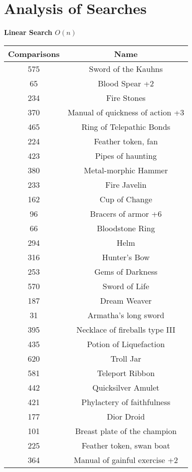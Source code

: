 \documentclass[letterpaper, 10pt]{article}
\begin{document}
\section{Analysis of Searches} 
\newpage
\begin{center}
    \bf{Linear Search $O(n)$}\\
    \begin{tabular}{|| c c ||}
    \hline
    \bf{Comparisons} & \bf{Name} \\
    \hline
    575 & Sword of the Kauhns \\
    65  & Blood Spear +2\\
    234 & Fire Stones\\
    370 & Manual of quickness of action +3\\
    465 & Ring of Telepathic Bonds\\
    224 & Feather token, fan\\
    423 & Pipes of haunting\\
    380 & Metal-morphic Hammer\\
    233 & Fire Javelin\\
    162 & Cup of Change\\
    96  & Bracers of armor +6\\
    66  & Bloodstone Ring\\
    294 & Helm\\
    316 & Hunter's Bow\\
    253 & Gems of Darkness\\
    570 & Sword of Life\\
    187 & Dream Weaver\\
    31  & Armatha's long sword\\
    395 & Necklace of fireballs type III\\
    435 & Potion of Liquefaction\\
    620 & Troll Jar\\
    581 & Teleport Ribbon\\
    442 & Quicksilver Amulet\\
    421 & Phylactery of faithfulness\\
    177 & Dior Droid\\
    101 & Breast plate of the champion\\
    225 & Feather token, swan boat\\
    364 & Manual of gainful exercise +2\\

\end{tabular}
\end{center}
\end{document}
